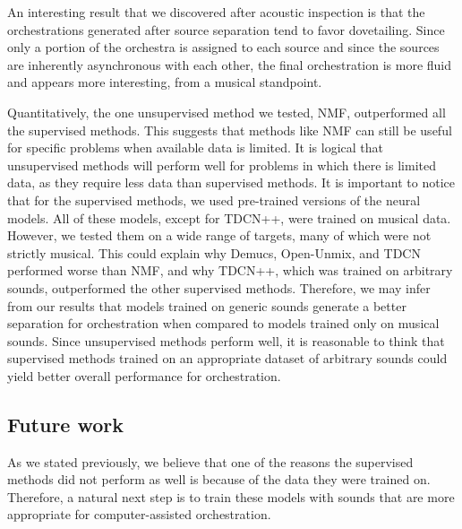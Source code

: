 \documentclass{article}
\begin{document}
	An interesting result that we discovered after acoustic inspection is that the orchestrations generated after source separation tend to favor dovetailing. Since only a portion of the orchestra is assigned to each source and since the sources are inherently asynchronous with each other, the final orchestration is more fluid and appears more interesting, from a musical standpoint.
  
  Quantitatively, the one unsupervised method we tested, NMF, outperformed all the supervised methods. This suggests that methods like NMF can still be useful for specific problems when available data is limited. It is logical that unsupervised methods will perform well for problems in which there is limited data, as they require less data than supervised methods. It is important to notice that for the supervised methods, we used pre-trained versions of the neural models. All of these models, except for TDCN++, were trained on musical data. However, we tested them on a wide range of targets, many of which were not strictly musical. This could explain why Demucs, Open-Unmix, and TDCN performed worse than NMF, and why TDCN++, which was trained on arbitrary sounds, outperformed the other supervised methods. Therefore, we may infer from our results that models trained on generic sounds generate a better separation for orchestration when compared to models trained only on musical sounds. Since unsupervised methods perform well, it is reasonable to think that supervised methods trained on an appropriate dataset of arbitrary sounds could yield better overall performance for orchestration.
  
    \subsection{Future work}\label{sec:futurework}  
    As we stated previously, we believe that one of the reasons the supervised methods did not perform as well is because of the data they were trained on. Therefore, a natural next step is to train these models with sounds that are more appropriate for computer-assisted orchestration.
    
    
\end{document}
